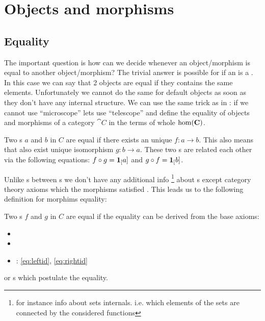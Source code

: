 \chapter{Objects and morphisms}

\section{Equality}

The important question is how can we decide whenever an
object/morphism is equal to another object/morphism? The trivial
answer is possible for if an  is a
. In this case we can say that 2 objects are equal
if they contains the same elements. Unfortunately we cannot do the
same for default objects as soon as they don't have any internal
structure. We can use the same trick as in
: if we cannot use ``microscope'' lets
use ``telescope'' and define the equality of objects and morphisms of
a category $\cat{C}$ in the terms of whole $\mathrm{hom}(\mathbf{C})$.

\begin{definition}
\label{def:object_equality}
Two s $a$ and $b$ in 
$C$ are equal if there exists an unique 
$f: a \to b$. This also means that also exist unique isomorphism $g: b
\to a$. These two s are related each other via
the following equations: $f \circ g = \mathbf{1}_{[}a]$ and $g \circ f
= \mathbf{1}_{[}b]$. 
\end{definition}

Unlike s between s we don't
have any additional info 
\footnote{
for instance info about sets internals. i.e. which elements of the sets
are connected by the considered functions
}
about s except
category theory axioms which the morphisms satisfied
\cite{bib:stackexchange:morphism:equality}. This leads us to the
following definition for morphims equality:
\begin{definition}
\label{def:morphism_equality}
Two s $f$ and $g$ in 
$C$ are equal if the equality can be derived from the base axioms: 
\begin{itemize}
\item {}
\item {}
\item {}: \eqref{eq:leftid}, \eqref{eq:rightid}
\end{itemize}
or s which postulate the equality.
\end{definition}

